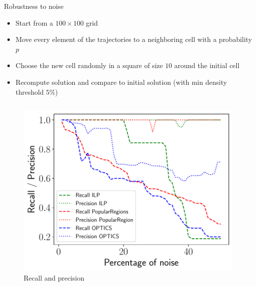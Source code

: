 \documentclass[10pt]{beamer}
\begin{document}
\begin{frame}{Robustness to noise}
    \begin{itemize}
        \item Start from a $100 \times 100$ grid
        \item Move every element of the trajectories to a neighboring cell with a probability $p$
        \item Choose the new cell randomly in a square of size $10$ around the initial cell
        \item Recompute solution and compare to initial solution (with min density threshold $5\%$)
    \end{itemize}
    \begin{columns}[T, onlytextwidth]

        \begin{figure}
            \centering
            \includegraphics[scale=0.3]{figures/results/recall-precision.pdf}
            \caption{Recall and precision}
        \end{figure}


\end{columns}
\end{frame}
\end{document}
